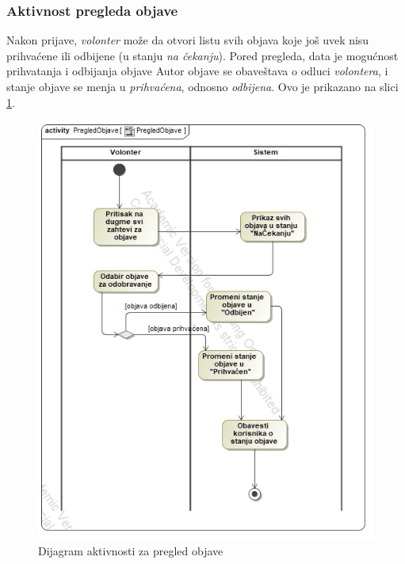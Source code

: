 \subsubsection*{Aktivnost pregleda objave}
\par Nakon prijave, \textit{volonter} može da otvori listu svih objava koje još uvek nisu prihvaćene ili odbijene (u stanju \textit{na čekanju}). Pored pregleda,
data je mogućnost prihvatanja i odbijanja objave Autor objave se obaveštava o odluci \textit{volontera}, i stanje objave se menja u \textit{prihvaćena}, odnosno
\textit{odbijena}. Ovo je prikazano na slici \ref{fig:activity-post-review}.
\begin{figure}[h]
    \centering
    \includegraphics[width=\textwidth, height=\textwidth]{img/activity-post-review.jpg}
    \caption{Dijagram aktivnosti za pregled objave}
    \label{fig:activity-post-review}
\end{figure}
